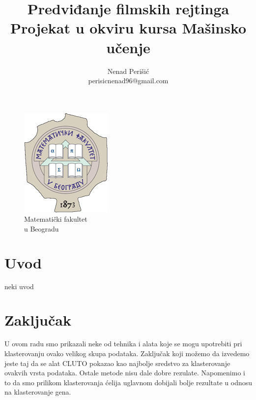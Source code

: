 \documentclass[a4paper]{article}
\begin{document}
\title{\textbf{Predviđanje filmskih rejtinga}\\
\small{Projekat u okviru kursa Mašinsko učenje}}

\author{Nenad Perišić\\perisicnenad96@gmail.com\\}

\medskip

\newpage

\maketitle


\vspace{2cm}
\begin{figure}[b!]
\begin{center}
\includegraphics[scale=0.67]{matf_logo.png} \\
\small{Matematički fakultet \\ u Beogradu}
\end{center}
\end{figure}


\pagebreak

\tableofcontents

\newpage

\section{Uvod}
\label{sec:uvod}
neki uvod
\cite{skripta}

\pagebreak

\section{Zaključak}
\label{sec:zakljucak}
U ovom radu smo prikazali neke od tehnika i alata koje se mogu upotrebiti pri klasterovanju ovako 
velikog skupa podataka. Zaključak koji možemo da izvedemo jeste taj da se alat CLUTO pokazao kao najbolje sredstvo za klasterovanje ovakvih vrsta podataka. Ostale metode nisu dale dobre rezulate. Napomenimo i to da smo prilikom klasterovanja ćelija uglavnom dobijali bolje rezultate u odnosu na klasterovanje gena.



\pagebreak

\appendix


\appendix
\end{document}
